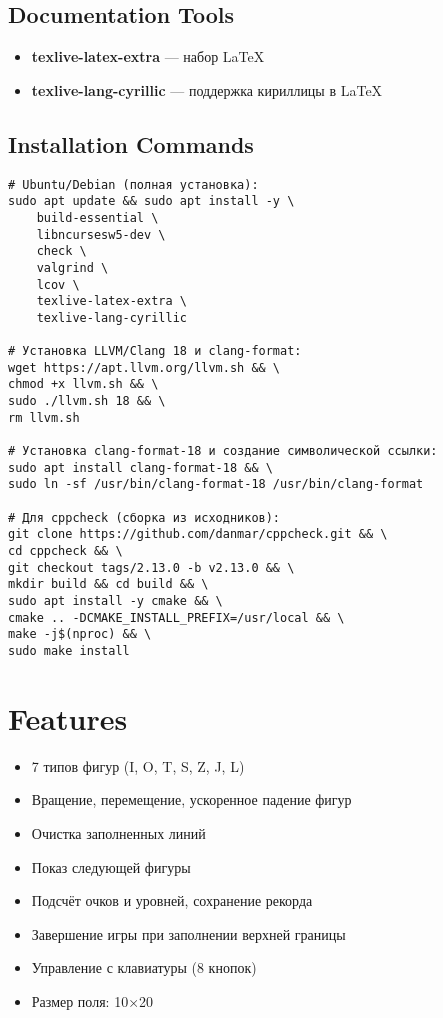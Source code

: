 \documentclass{article}
\begin{document}
\subsection{Documentation Tools}
\begin{itemize}
  \item \textbf{texlive-latex-extra} — набор LaTeX
  \item \textbf{texlive-lang-cyrillic} — поддержка кириллицы в LaTeX
\end{itemize}

\subsection{Installation Commands}
\begin{verbatim}
# Ubuntu/Debian (полная установка):
sudo apt update && sudo apt install -y \
    build-essential \
    libncursesw5-dev \
    check \
    valgrind \
    lcov \
    texlive-latex-extra \
    texlive-lang-cyrillic

# Установка LLVM/Clang 18 и clang-format:
wget https://apt.llvm.org/llvm.sh && \
chmod +x llvm.sh && \
sudo ./llvm.sh 18 && \
rm llvm.sh

# Установка clang-format-18 и создание символической ссылки:
sudo apt install clang-format-18 && \
sudo ln -sf /usr/bin/clang-format-18 /usr/bin/clang-format

# Для cppcheck (сборка из исходников):
git clone https://github.com/danmar/cppcheck.git && \
cd cppcheck && \
git checkout tags/2.13.0 -b v2.13.0 && \
mkdir build && cd build && \
sudo apt install -y cmake && \
cmake .. -DCMAKE_INSTALL_PREFIX=/usr/local && \
make -j$(nproc) && \
sudo make install
\end{verbatim}

\section{Features}
\begin{itemize}
  \item 7 типов фигур (I, O, T, S, Z, J, L)
  \item Вращение, перемещение, ускоренное падение фигур
  \item Очистка заполненных линий
  \item Показ следующей фигуры
  \item Подсчёт очков и уровней, сохранение рекорда
  \item Завершение игры при заполнении верхней границы
  \item Управление с клавиатуры (8 кнопок)
  \item Размер поля: 10×20
\end{itemize}
\end{document}
